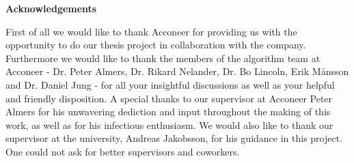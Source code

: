 \newenvironment{acknowledgements}%
    {\cleardoublepage\thispagestyle{empty}\null\vfill\begin{center}%
    \bfseries{\textsf{Acknowledgements}}\end{center}}
    {\vfill\null}
        \begin{acknowledgements}	
	First of all we would like to thank Acconeer for providing us with the opportunity to do our thesis project in collaboration with the company. Furthermore we would like to thank the members of the algorithm team at Acconeer - Dr. Peter Almers, Dr. Rikard Nelander, Dr. Bo Lincoln, Erik Månsson and Dr. Daniel Jung - for all your insightful discussions as well as your helpful and friendly disposition. A special thanks to our supervisor at Acconeer Peter Almers for his unwavering dediction and input throughout the making of this work, as well as for his infectious enthusiasm. We would also like to thank our supervisor at the university, Andreas Jakobsson, for his guidance in this project. One could not ask for better supervisors and coworkers.
        \end{acknowledgements}
